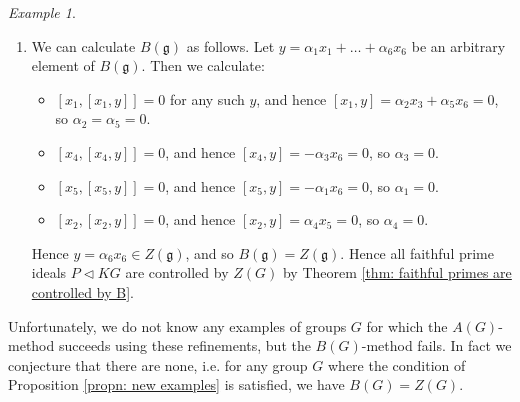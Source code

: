 \documentclass[12pt,a4paper]{article}
\theoremstyle{definition}
\theoremstyle{remark}
\newtheorem{ex}[thm]{Example}
\newtheorem{nonex}[thm]{Non-example}
\theoremstyle{custthm}
\begin{document}
\begin{ex}
\begin{enumerate}[label=(\roman*)]
So since $\mathfrak{h}$ has nilpotency class 2, $B(\mathfrak{h})=Z(\mathfrak{h})=\langle x_5, x_6\rangle=Z_2(\mathfrak{g})$, so we can apply Proposition \ref{propn: new examples} to get that all faithful prime ideals in $KG$ are controlled by $Z(G)$.

\item We can calculate $B(\mathfrak{g})$ as follows. Let $y = \alpha_1 x_1 + \dots + \alpha_6 x_6$ be an arbitrary element of $B(\mathfrak{g})$. Then we calculate:
\begin{itemize}
\item $[x_1,[x_1, y]] = 0$ for any such $y$, and hence $[x_1, y] = \alpha_2 x_3 + \alpha_5 x_6 = 0$, so $\alpha_2 = \alpha_5 = 0$.
\item $[x_4,[x_4, y]] = 0$, and hence $[x_4, y] = -\alpha_3 x_6 = 0$, so $\alpha_3 = 0$.
\item $[x_5,[x_5, y]] = 0$, and hence $[x_5, y] = -\alpha_1 x_6 = 0$, so $\alpha_1 = 0$.
\item $[x_2,[x_2, y]] = 0$, and hence $[x_2, y] = \alpha_4 x_5 = 0$, so $\alpha_4 = 0$.
\end{itemize}
Hence $y = \alpha_6 x_6 \in Z(\mathfrak{g})$, and so $B(\mathfrak{g}) = Z(\mathfrak{g})$. Hence all faithful prime ideals $P\lhd KG$ are controlled by $Z(G)$ by Theorem \ref{thm: faithful primes are controlled by B}.
\end{enumerate}
\end{ex}

\noindent Unfortunately, we do not know any examples of groups $G$ for which the $A(G)$-method succeeds using these refinements, but the $B(G)$-method fails. In fact we conjecture that there are none, i.e. for any group $G$ where the condition of Proposition \ref{propn: new examples} is satisfied, we have $B(G)=Z(G)$.


\end{document}
